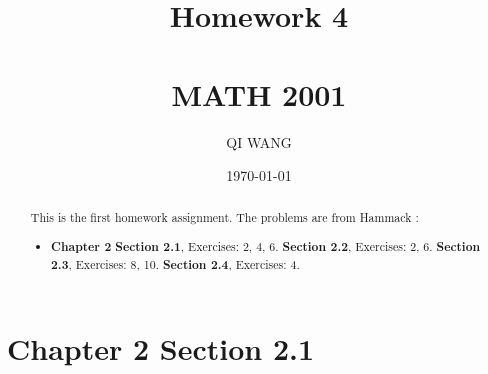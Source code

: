 \documentclass[12pt]{amsart}
\numberwithin{equation}{section}
\theoremstyle{definition}
\theoremstyle{remark}
\begin{document}




\author[QI WANG]{QI WANG}
\address{University of Colorado, Department of Mathematics,  Campus Box 395,
Boulder, CO 80309-0395}
\date{\today}



\title[Homework 4]{Homework 4 \\ \ \\  MATH 2001}

\begin{abstract} 
This is the first homework assignment.  The problems are from Hammack \cite[Ch.~2]{H13}:
\begin{itemize}

\item \textbf{Chapter 2}  
\textbf{Section 2.1}, Exercises:  2, 4, 6.
\textbf{Section 2.2}, Exercises:  2, 6.
\textbf{Section 2.3}, Exercises:  8, 10.
\textbf{Section 2.4}, Exercises:  4.



\end{itemize}
\end{abstract}


\maketitle


\tableofcontents





\section*{Chapter 2 Section 2.1}


\end{document}
